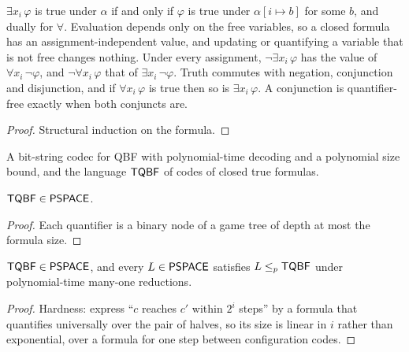 \begin{lemma}
  \label{lem:space-qbf-semantics}
  \leanok
  $\exists x_i\, \varphi$ is true under $\alpha$ if and only if $\varphi$ is
  true under $\alpha[i \mapsto b]$ for some $b$, and dually for $\forall$.
  Evaluation depends only on the free variables, so a closed formula has an
  assignment-independent value, and updating or quantifying a variable that is
  not free changes nothing. Under every assignment,
  $\neg \exists x_i\, \varphi$ has the value of $\forall x_i\, \neg \varphi$,
  and $\neg \forall x_i\, \varphi$ that of $\exists x_i\, \neg \varphi$. Truth
  commutes with negation, conjunction and disjunction, and if
  $\forall x_i\, \varphi$ is true then so is $\exists x_i\, \varphi$. A
  conjunction is quantifier-free exactly when both conjuncts are.
\end{lemma}
\begin{proof}
  \leanok
  Structural induction on the formula.
\end{proof}

\begin{definition}[TQBF]
  \label{def:space-tqbf}
  A bit-string codec for QBF with polynomial-time decoding and a polynomial
  size bound, and the language $\mathsf{TQBF}$ of codes of closed true formulas.
\end{definition}

\begin{theorem}
  \label{thm:space-tqbf-in-pspace}
  \notready
  $\mathsf{TQBF} \in \mathsf{PSPACE}$.
\end{theorem}
\begin{proof}
  Each quantifier is a binary node of a game tree of depth at most the formula
  size.
\end{proof}

\begin{theorem}
  \label{thm:space-tqbf-complete}
  \notready
  $\mathsf{TQBF} \in \mathsf{PSPACE}$, and every $L \in \mathsf{PSPACE}$ satisfies
  $L \le_p \mathsf{TQBF}$ under polynomial-time many-one reductions.
\end{theorem}
\begin{proof}
  Hardness: express ``$c$ reaches $c'$ within $2^i$ steps'' by a formula that
  quantifies universally over the pair of halves, so its size is linear in $i$
  rather than exponential, over a formula for one step between configuration
  codes.
\end{proof}

